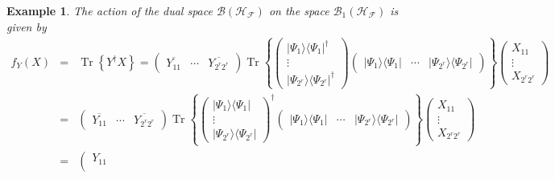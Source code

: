 \documentclass[aps, preprint]{revtex4}
\newtheorem{example}[theorem]{Example}
\begin{document}
\begin{example}
The action of the dual space $\mathcal{B} \left (\mathcal{H}_{\mathcal{F}}\right )$ on the space $\mathcal{B}_{1} \left (\mathcal{H}_{\mathcal{F}}\right )$ is given by
\begin{align}f_{Y} \left (X\right ) &  = & \ensuremath{\operatorname*{Tr}} \left \{Y^{ \dag } X\right \} =\left (\begin{array}{ccc}\overline{Y_{1 1}} & \cdots  & \overline{Y_{2^{r} 2^{r}}}\end{array}\right ) \ensuremath{\operatorname*{Tr}} \left \{\left (\begin{array}{c}\vert \Psi _{1} \rangle  \langle \Psi _{1}\vert ^{ \dag } \\
\vdots  \\
\vert \Psi _{2^{r}} \rangle  \langle \Psi _{2^{r}}\vert ^{ \dag }\end{array}\right ) \left (\begin{array}{ccc}\vert \Psi _{1} \rangle  \langle \Psi _{1}\vert  & \cdots  & \vert \Psi _{2^{r}} \rangle  \langle \Psi _{2^{r}}\vert \end{array}\right )\right \} \left (\begin{array}{c}X_{1 1} \\
\vdots  \\
X_{2^{r} 2^{r}}\end{array}\right ) \\
 &  = & \left (\begin{array}{ccc}\overline{Y_{1 1}} & \cdots  & \overline{Y_{2^{r} 2^{r}}}\end{array}\right ) \ensuremath{\operatorname*{Tr}} \left \{\left (\begin{array}{c}\vert \Psi _{1} \rangle  \langle \Psi _{1}\vert  \\
\vdots  \\
\vert \Psi _{2^{r}} \rangle  \langle \Psi _{2^{r}}\vert \end{array}\right )^{ \dag } \left (\begin{array}{ccc}\vert \Psi _{1} \rangle  \langle \Psi _{1}\vert  & \cdots  & \vert \Psi _{2^{r}} \rangle  \langle \Psi _{2^{r}}\vert \end{array}\right )\right \} \left (\begin{array}{c}X_{1 1} \\
\vdots  \\
X_{2^{r} 2^{r}}\end{array}\right ) \\
 &  = & \left (\begin{array}{c}Y_{1 1} \\

\end{array}
\end{align}
\end{example}
\end{document}
